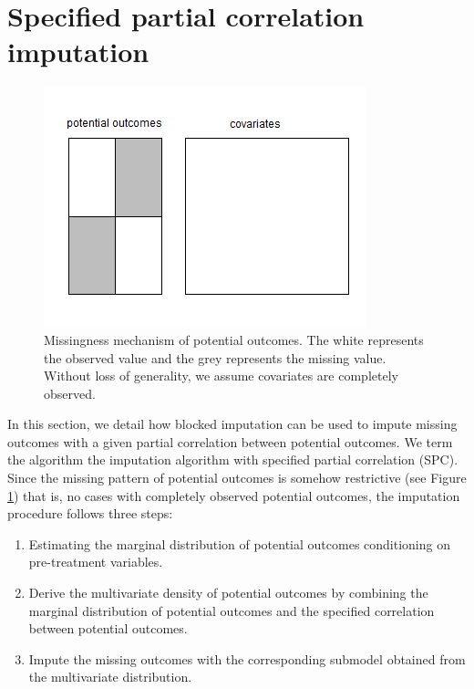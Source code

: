	\section{Specified partial correlation imputation}
	\label{sec:4.4}
	\begin{figure}[ht!]
		\centering
		\includegraphics[width=1.0\linewidth,height=0.5\textheight]{plots/potentialoutcome} 
		\caption{Missingness mechanism of potential outcomes. The white represents the observed value and the grey represents the missing value. Without loss of generality, we assume covariates are completely observed.}
		\label{fig4_1}
	\end{figure}
	
	In this section, we detail how blocked imputation can be used to impute missing outcomes with a given partial correlation between potential outcomes. We term the algorithm the imputation algorithm with specified partial correlation (SPC). Since the missing pattern of potential outcomes is somehow restrictive (see Figure \ref{fig4_1}) that is, no cases with completely observed potential outcomes, the imputation procedure follows three steps: 
	
	\begin{enumerate}
		\item Estimating the marginal distribution of potential outcomes conditioning on pre-treatment variables. 
		\item Derive the multivariate density of potential outcomes by combining the marginal distribution of potential outcomes and the specified correlation between potential outcomes. 
		\item Impute the missing outcomes with the corresponding submodel obtained from the multivariate distribution. 
	\end{enumerate}	
	
